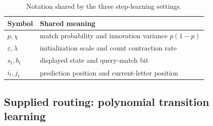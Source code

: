 \begin{table}[htbp]
\centering\small
{}
\caption{Three complementary step-learning settings. The full-prefix theorem does not subsume the supplied-routing results.}
\label{tab:step-settings}
\end{table}

\begin{table}[htbp]
\centering\small
\begin{tabular}{@{}ll@{}}
\toprule
Symbol & Shared meaning\\
\midrule
$p,\chi$ & match probability and innovation variance $p(1-p)$\\
$\varepsilon,\lambda$ & initialization scale and count contraction rate\\
$s_t,b_t$ & displayed state and query-match bit\\
$i_t,j_t$ & prediction position and current-letter position\\
\bottomrule
\end{tabular}
\caption{Notation shared by the three step-learning settings.}
\label{tab:step-global-notation}
\end{table}



\subsection{Supplied routing: polynomial transition learning}
\label{app:step-supplied-routing}

